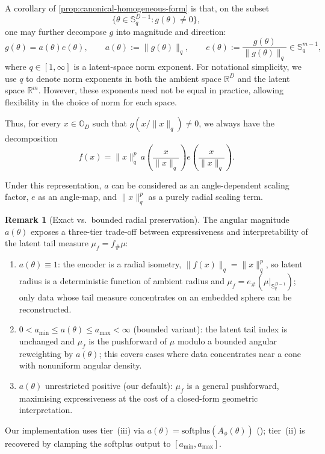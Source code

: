 \documentclass{article}
\theoremstyle{definition}
\newtheorem{remark}[theorem]{Remark}
\begin{document}
A corollary of \ref{prop:canonical-homogeneous-form} is that, on the subset
\[
\{\theta \in \mathbb{S}^{D-1}_{q} : g(\theta) \neq 0\},
\]
one may further decompose \(g\) into magnitude and direction:
\[
g(\theta) = a(\theta)e(\theta),
\qquad
a(\theta) := \|g(\theta)\|_{q},
\qquad
e(\theta) := \frac{g(\theta)}{\|g(\theta)\|_{q}} \in \mathbb{S}^{m-1}_{q},
\]
where \(q \in [1,\infty]\) is a latent-space norm exponent. For notational simplicity, we use \(q\) to denote norm exponents in both the ambient space \(\mathbb{R}^D\) and the latent space \(\mathbb{R}^m\). However, these exponents need not be equal in practice, allowing flexibility in the choice of norm for each space.

Thus, for every \(x \in \mathbb{O}_D\) such that
\(g(x/\|x\|_{q}) \neq 0\), we always have the decomposition
\[
f(x)
=
\|x\|_{q}^p\,
a\!\left(\frac{x}{\|x\|_{q}}\right)
e\!\left(\frac{x}{\|x\|_{q}}\right).
\]

Under this representation, \(a\) can be considered as an angle-dependent scaling factor, \(e\) as an angle-map, and \(\|x\|_{q}^p\) as a purely radial scaling term.

\begin{remark}[Exact vs.\ bounded radial preservation]
\label{rmk:exact-vs-bounded-radial}
The angular magnitude \(a(\theta)\) exposes a three-tier trade-off between expressiveness and interpretability of the latent tail measure \(\mu_f=f_{\#}\mu\):
\begin{enumerate}
  \item[(i)] \(a(\theta)\equiv 1\): the encoder is a radial isometry, \(\|f(x)\|_q=\|x\|_q^{p}\), so latent radius is a deterministic function of ambient radius and \(\mu_f=e_{\#}(\mu|_{\mathbb{S}^{D-1}_q})\); only data whose tail measure concentrates on an embedded sphere can be reconstructed.
  \item[(ii)] \(0<a_{\min}\le a(\theta)\le a_{\max}<\infty\) (bounded variant): the latent tail index is unchanged and \(\mu_f\) is the pushforward of \(\mu\) modulo a bounded angular reweighting by \(a(\theta)\); this covers cases where data concentrates near a cone with nonuniform angular density.
  \item[(iii)] \(a(\theta)\) unrestricted positive (our default): \(\mu_f\) is a general pushforward, maximising expressiveness at the cost of a closed-form geometric interpretation.
\end{enumerate}
Our implementation uses tier~(iii) via \(a(\theta)=\mathrm{softplus}(A_\phi(\theta))\) (); tier~(ii) is recovered by clamping the softplus output to \([a_{\min},a_{\max}]\).
\end{remark}
\end{document}
